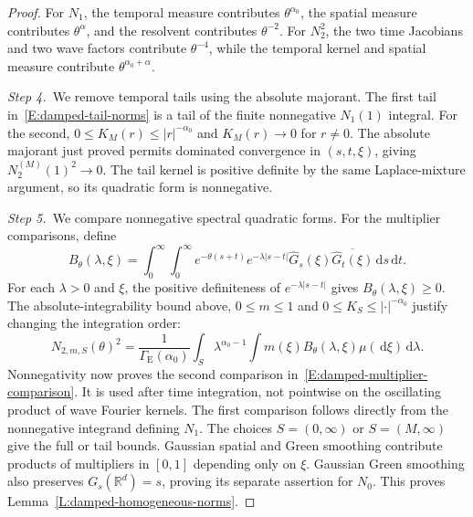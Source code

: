 \documentclass[12pt,oneside,openany]{book}
\numberwithin{equation}{section}
\theoremstyle{nogostyle}
\theoremstyle{definition}
\newcommand{\R}{\mathbb{R}}
\newcommand{\ud}{\,\mathrm{d}}
\begin{document}
\begin{proof}
  For $N_1$, the temporal measure contributes $\theta^{\alpha_0}$, the spatial
  measure contributes $\theta^\alpha$, and the resolvent contributes
  $\theta^{-2}$. For $N_2^2$, the two time Jacobians and two wave factors
  contribute $\theta^{-4}$, while the temporal kernel and spatial measure
  contribute $\theta^{\alpha_0+\alpha}$.

  \medskip
  \noindent\textit{Step 4.~}We remove temporal tails using the absolute
  majorant.
  The first tail in~\eqref{E:damped-tail-norms} is a tail of the finite
  nonnegative $N_1(1)$ integral. For the second, $0 \le K_M(r) \le
  |r|^{-\alpha_0}$ and $K_M(r) \to 0$ for $r \ne 0$. The absolute majorant just
  proved permits dominated convergence in $(s,t,\xi)$, giving $N_2^{(M)}(1)^2
  \to 0$. The tail kernel is positive definite by the same Laplace-mixture
  argument, so its quadratic form is nonnegative.


  \medskip
  \noindent\textit{Step 5.~}We compare nonnegative spectral quadratic forms.
  For the multiplier comparisons, define
  \[
    B_\theta(\lambda,\xi)=\int_0^\infty\int_0^\infty
    e^{-\theta(s+t)}e^{-\lambda|s-t|}
    \widehat G_s(\xi)\overline{\widehat G_t(\xi)}\ud s\ud t.
  \]
  For each $\lambda>0$ and $\xi$, the positive definiteness of
  $e^{-\lambda|s-t|}$ gives $B_\theta(\lambda,\xi)\ge0$.
  The absolute-integrability bound above, $0\le m\le1$ and
  $0\le K_S\le|\cdot|^{-\alpha_0}$ justify changing the integration order:
  \[
    N_{2,m,S}(\theta)^2
    =\frac1{\Gamma_{\mathrm{E}}(\alpha_0)}
    \int_S\lambda^{\alpha_0-1}
    \int m(\xi)B_\theta(\lambda,\xi)\mu(\ud\xi)\ud\lambda.
  \]
  Nonnegativity now proves the second comparison
  in~\eqref{E:damped-multiplier-comparison}. It is used after time integration,
  not pointwise on the oscillating product of wave Fourier kernels. The first
  comparison follows directly from the nonnegative integrand defining $N_1$.
  The choices $S=(0,\infty)$ or $S=(M,\infty)$ give the full or tail bounds.
  Gaussian spatial and Green smoothing contribute products of multipliers in
  $[0,1]$ depending only on $\xi$. Gaussian Green smoothing also preserves
  $G_s(\R^d)=s$, proving its separate assertion for $N_0$. This proves
  Lemma~\ref{L:damped-homogeneous-norms}.
\end{proof}
\end{document}
